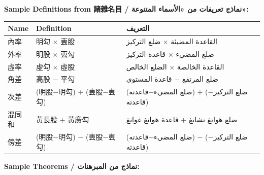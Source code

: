 \documentclass[11pt,a4paper]{article}
\newcommand{\ar}[1]{\arabicfont\beginR #1\endR}
\begin{document}
\vspace{0.3cm}

\noindent\textbf{Sample Definitions from 諸雜名目 / \ar{نماذج تعريفات من «الأسماء المتنوعة»}:}

\vspace{0.3cm}

\begin{center}
\begin{tabular}{lll}
\toprule
\textbf{Name} & \textbf{Definition} & \textbf{\ar{التعريف}} \\
\midrule
內率 & 明勾 $\times$ 叀股 & \ar{القاعدة المضيئة $\times$ ضلع التركيز} \\
外率 & 明股 $\times$ 叀勾 & \ar{ضلع المضيء $\times$ قاعدة التركيز} \\
虛率 & 虛勾 $\times$ 虛股 & \ar{القاعدة الخالصة $\times$ الضلع الخالص} \\
角差 & 高股 $-$ 平勾 & \ar{ضلع المرتفع $-$ قاعدة المستوي} \\
次差 & (明股$-$明勾) $+$ (叀股$-$叀勾) & \ar{(ضلع المضيء$-$قاعدته) $+$ (ضلع التركيز$-$قاعدته)} \\
混同和 & 黃長股 $+$ 黃廣勾 & \ar{ضلع هوانغ تشانغ $+$ قاعدة هوانغ غوانغ} \\
傍差 & (明股$-$明勾) $-$ (叀股$-$叀勾) & \ar{(ضلع المضيء$-$قاعدته) $-$ (ضلع التركيز$-$قاعدته)} \\
\bottomrule
\end{tabular}
\end{center}

\vspace{0.3cm}

\noindent\textbf{Sample Theorems / \ar{نماذج من المبرهنات}:}

\vspace{0.3cm}
\end{document}

